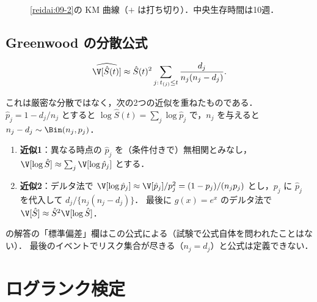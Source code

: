 \begin{figure}[htbp]
\centering
{}
\caption{\cref{reidai:09-2}の KM 曲線（$+$ は打ち切り）．中央生存時間は10週．}\label{fig:09-km}
\end{figure}

\subsection{Greenwood の分散公式}\label{subsec:09-greenwood}
\begin{pointbox}
\begin{equation}
\widehat\V[\hat S(t)]\approx\hat S(t)^2\sum_{j:\,t_{(j)}\le t}\frac{d_j}{n_j(n_j-d_j)}.\label{eq:09-greenwood}
\end{equation}
\end{pointbox}
これは厳密な分散ではなく，次の2つの近似を重ねたものである．
$\hat p_j=1-d_j/n_j$ とすると $\log\hat S(t)=\sum_j\log\hat p_j$ で，$n_j$ を与えると $n_j-d_j\sim\Bin(n_j,p_j)$．
\begin{enumerate}
\item \textbf{近似1}：異なる時点の $\hat p_j$ を（条件付きで）無相関とみなし，$\V[\log\hat S]\approx\sum_j\V[\log\hat p_j]$ とする．
\item \textbf{近似2}：デルタ法で $\V[\log\hat p_j]\approx\V[\hat p_j]/p_j^2=(1-p_j)/(n_jp_j)$ とし，$p_j$ に $\hat p_j$ を代入して $d_j/\{n_j(n_j-d_j)\}$．
      最後に $g(x)=e^x$ のデルタ法で $\V[\hat S]\approx\hat S^2\V[\log\hat S]$．
\end{enumerate}
 の解答の「標準偏差」欄はこの公式による（試験で公式自体を問われたことはない）．
最後のイベントでリスク集合が尽きる（$n_j=d_j$）と公式は定義できない．

\section{ログランク検定}\label{sec:09-logrank}
\Hissu\Hinshutsu
